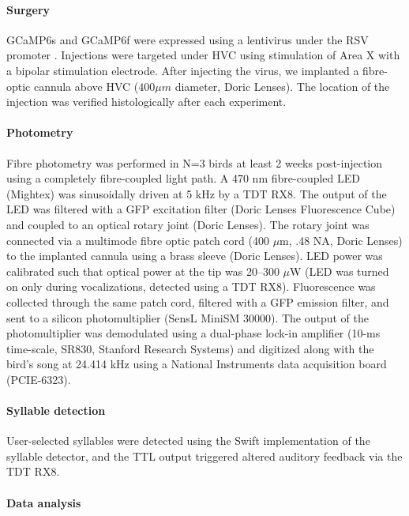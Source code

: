 \documentclass[10pt,letterpaper]{article}
\renewcommand{\subsubsection}[1]{\paragraph{#1}}
\begin{document}
\subsubsection{Surgery}

GCaMP6s and GCaMP6f were expressed using a lentivirus under the RSV 
promoter \cite{Markowitz:2015ko}. Injections were targeted under HVC 
using stimulation of Area X with a bipolar stimulation electrode. 
After injecting the virus, we implanted a fibre-optic cannula above 
HVC ($400 \mu m$ diameter, Doric Lenses). The location of the injection 
was verified histologically after each experiment.

\subsubsection{Photometry}

Fibre photometry \cite{Adelsberger:2005dy,Schulz:2012fv,Cui:2013dq,Adelsberger:2014jd,Gunaydin:2014dh} 
was performed in N=3 birds at least 2 weeks post-injection using a 
completely fibre-coupled light path. A 470 nm fibre-coupled LED (Mightex) 
was sinusoidally driven at 5 kHz by a TDT RX8. The output of the LED 
was filtered with a GFP excitation filter (Doric Lenses Fluorescence Cube) 
and coupled to an optical rotary joint (Doric Lenses). The rotary joint 
was connected via a multimode fibre optic patch cord (400 $\mu$m, .48 NA, 
Doric Lenses) to the implanted cannula using a brass sleeve (Doric Lenses). 
LED power was calibrated such that optical power at the tip was 
20--300 $\mu$W (LED was turned on only during vocalizations, detected using 
a TDT RX8). Fluorescence was collected through the same patch cord, 
filtered with a GFP emission filter, and sent to a silicon photomultiplier 
(SensL MiniSM 30000). The output of the photomultiplier was demodulated 
using a dual-phase lock-in amplifier (10-ms time-scale, SR830, Stanford 
Research Systems) and digitized along with the bird's song at 24.414 kHz 
using a National Instruments data acquisition board (PCIE-6323).

\subsubsection{Syllable detection}

User-selected syllables were detected using the Swift implementation of the
syllable detector, and the TTL output triggered altered auditory feedback 
via the TDT RX8.

\subsubsection{Data analysis}
\end{document}
